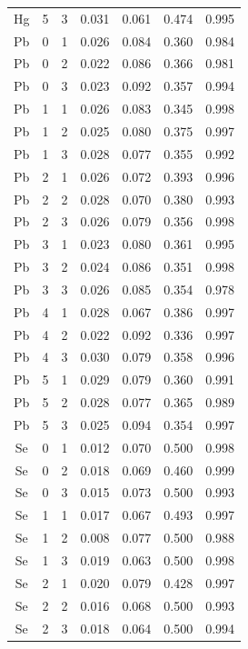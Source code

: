 \documentclass[ms, hidelinks]{uncgdissertationexp}
\theoremstyle{plain}
\theoremstyle{definition}
\theoremstyle{remark}
\begin{document}
\begin{longtable}{ccccccc}
Hg & 5 & 3 & 0.031 & 0.061 & 0.474 & 0.995\\
\rowcolor{gray!6}  Pb & 0 & 1 & 0.026 & 0.084 & 0.360 & 0.984\\
Pb & 0 & 2 & 0.022 & 0.086 & 0.366 & 0.981\\
\rowcolor{gray!6}  Pb & 0 & 3 & 0.023 & 0.092 & 0.357 & 0.994\\
Pb & 1 & 1 & 0.026 & 0.083 & 0.345 & 0.998\\
\rowcolor{gray!6}  Pb & 1 & 2 & 0.025 & 0.080 & 0.375 & 0.997\\
Pb & 1 & 3 & 0.028 & 0.077 & 0.355 & 0.992\\
\rowcolor{gray!6}  Pb & 2 & 1 & 0.026 & 0.072 & 0.393 & 0.996\\
Pb & 2 & 2 & 0.028 & 0.070 & 0.380 & 0.993\\
\rowcolor{gray!6}  Pb & 2 & 3 & 0.026 & 0.079 & 0.356 & 0.998\\
Pb & 3 & 1 & 0.023 & 0.080 & 0.361 & 0.995\\
\rowcolor{gray!6}  Pb & 3 & 2 & 0.024 & 0.086 & 0.351 & 0.998\\
Pb & 3 & 3 & 0.026 & 0.085 & 0.354 & 0.978\\
\rowcolor{gray!6}  Pb & 4 & 1 & 0.028 & 0.067 & 0.386 & 0.997\\
Pb & 4 & 2 & 0.022 & 0.092 & 0.336 & 0.997\\
\rowcolor{gray!6}  Pb & 4 & 3 & 0.030 & 0.079 & 0.358 & 0.996\\
Pb & 5 & 1 & 0.029 & 0.079 & 0.360 & 0.991\\
\rowcolor{gray!6}  Pb & 5 & 2 & 0.028 & 0.077 & 0.365 & 0.989\\
Pb & 5 & 3 & 0.025 & 0.094 & 0.354 & 0.997\\
\rowcolor{gray!6}  Se & 0 & 1 & 0.012 & 0.070 & 0.500 & 0.998\\
Se & 0 & 2 & 0.018 & 0.069 & 0.460 & 0.999\\
\rowcolor{gray!6}  Se & 0 & 3 & 0.015 & 0.073 & 0.500 & 0.993\\
Se & 1 & 1 & 0.017 & 0.067 & 0.493 & 0.997\\
\rowcolor{gray!6}  Se & 1 & 2 & 0.008 & 0.077 & 0.500 & 0.988\\
Se & 1 & 3 & 0.019 & 0.063 & 0.500 & 0.998\\
\rowcolor{gray!6}  Se & 2 & 1 & 0.020 & 0.079 & 0.428 & 0.997\\
Se & 2 & 2 & 0.016 & 0.068 & 0.500 & 0.993\\
\rowcolor{gray!6}  Se & 2 & 3 & 0.018 & 0.064 & 0.500 & 0.994\\

\end{longtable}
\end{document}
